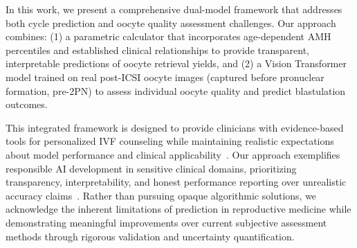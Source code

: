 In this work, we present a comprehensive dual-model framework that addresses both cycle prediction and oocyte quality assessment challenges. Our approach combines: (1) a parametric calculator that incorporates age-dependent AMH percentiles and established clinical relationships to provide transparent, interpretable predictions of oocyte retrieval yields, and (2) a Vision Transformer model trained on real post-ICSI oocyte images (captured before pronuclear formation, pre-2PN) to assess individual oocyte quality and predict blastulation outcomes.

This integrated framework is designed to provide clinicians with evidence-based tools for personalized IVF counseling while maintaining realistic expectations about model performance and clinical applicability~\cite{asrm2021counselors}. Our approach exemplifies responsible AI development in sensitive clinical domains, prioritizing transparency, interpretability, and honest performance reporting over unrealistic accuracy claims~\cite{varoquaux2022machine}. Rather than pursuing opaque algorithmic solutions, we acknowledge the inherent limitations of prediction in reproductive medicine while demonstrating meaningful improvements over current subjective assessment methods through rigorous validation and uncertainty quantification. 
